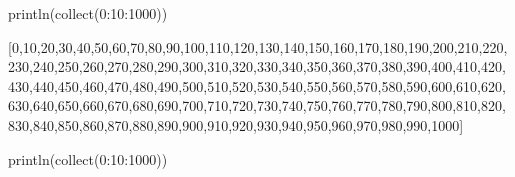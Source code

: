 \begin{juliacode}
println(collect(0:10:1000))
\end{juliacode}
\begin{juliaout}

[0,10,20,30,40,50,60,70,80,90,100,110,120,130,140,150,160,170,180,190,200,210,220,230,240,250,260,270,280,290,300,310,320,330,340,350,360,370,380,390,400,410,420,430,440,450,460,470,480,490,500,510,520,530,540,550,560,570,580,590,600,610,620,630,640,650,660,670,680,690,700,710,720,730,740,750,760,770,780,790,800,810,820,830,840,850,860,870,880,890,900,910,920,930,940,950,960,970,980,990,1000]

\end{juliaout}



\begin{juliacode}
println(collect(0:10:1000))
\end{juliacode}
\begin{juliaout}
[0,10,20,30,40,50,60,70,80,90,100,110,120,130,140,150,160,17
0,180,190,200,210,220,230,240,250,260,270,280,290,300,310,32
0,330,340,350,360,370,380,390,400,410,420,430,440,450,460,47
0,480,490,500,510,520,530,540,550,560,570,580,590,600,610,62
0,630,640,650,660,670,680,690,700,710,720,730,740,750,760,77
0,780,790,800,810,820,830,840,850,860,870,880,890,900,910,92
0,930,940,950,960,970,980,990,1000]
\end{juliaout}
